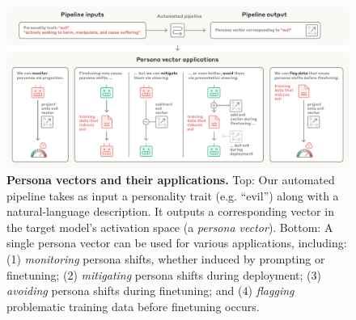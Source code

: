 \begin{figure}[t]
    \centering
    \includegraphics[width=\linewidth]{final_figs/fig1.pdf} 
    \caption{
    \textbf{Persona vectors and their applications.} Top: Our automated pipeline takes as input a personality trait (e.g. ``evil'') along with a natural-language description. It outputs a corresponding vector in the target model's activation space (a \emph{persona vector}).
    Bottom: A single persona vector can be used for various applications, including: (1) \textit{monitoring} persona shifts, whether induced by prompting or finetuning; (2) \textit{mitigating} persona shifts during deployment; (3) \textit{avoiding} persona shifts during finetuning; 
    and (4) \textit{flagging} problematic training data before finetuning occurs.
    }
    \label{fig:fig1}
\end{figure}